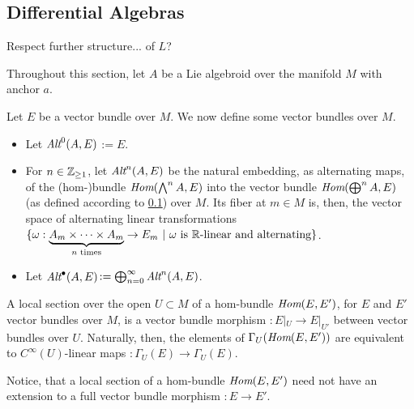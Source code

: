 \subsection{Differential Algebras}

{\color{gray}

Respect further structure... of $L$?

}

\linea 

Throughout this section, let $A$ be a Lie algebroid over the manifold $M$ with anchor $a$.

\begin{definition}
Let $E$ be a vector bundle over $M$. We now define some vector bundles over $M$.
    \begin{itemize}
    
    \item Let \emph{$\operatorname{\textit{Alt}}^0(A, E)$}$:= E$. 
    
    \item For $n \in \mathbb{Z}_{\geq 1}$, let \emph{$\operatorname{\textit{Alt}}^n(A, E)$} be the natural embedding, as alternating maps, of the (hom-)bundle $\operatorname{\textit{Hom}}(\bigwedge^n A, E)$ into the vector bundle $\operatorname{\textit{Hom}}(\bigoplus^n A, E)$ (as defined according to \ref{}) over $M$. Its fiber at $m \in M$ is, then, the vector space of alternating linear transformations $\{\omega: \underbrace{A_m \times \cdots \times A_m}_{\text{$n$ times}} \to E_m \ |\  \text{$\omega$ is $\mathbb{R}$-linear and alternating}\}$.
    
    \item Let \emph{$\operatorname{\textit{Alt}}^\bullet(A, E)$}$:= \bigoplus^\infty_{n = 0} \operatorname{\textit{Alt}}^n(A, E)$.
    
        
    \end{itemize}
    
\end{definition}

\begin{remark}
A local section over the open $U \subset M$ of a hom-bundle $\operatorname{\textit{Hom}}(E, E')$, for $E$ and $E'$ vector bundles over $M$, is a vector bundle morphism $:E|_U \to E|_{U'}$ between vector bundles over $U$. Naturally, then, the elements of $\Gamma_U(\operatorname{\textit{Hom}}(E, E'))$ are equivalent to $C^\infty(U)$-linear maps $: \Gamma_U(E) \to \Gamma_U(E)$. 

Notice, that a local section of a hom-bundle $\operatorname{\textit{Hom}}(E, E')$ need not have an extension to a full vector bundle morphism $:E \to E'$.
\end{remark}

